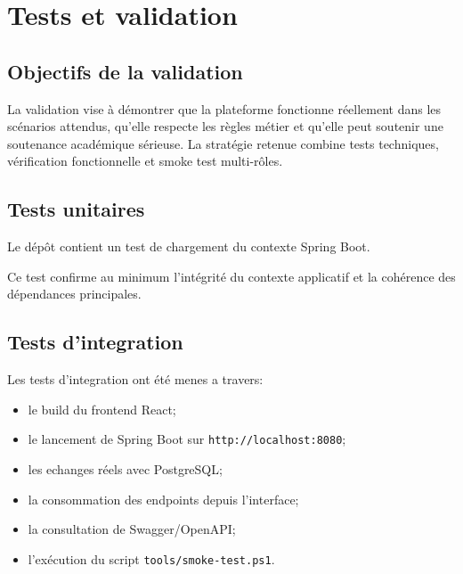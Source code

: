 ﻿\chapter{Tests et validation}
\label{chap:tests}

\section{Objectifs de la validation}
La validation vise à démontrer que la plateforme fonctionne réellement dans les scénarios attendus, qu'elle respecte les règles métier et qu'elle peut soutenir une soutenance académique sérieuse. La stratégie retenue combine tests techniques, vérification fonctionnelle et smoke test multi-rôles.

\section{Tests unitaires}
Le dépôt contient un test de chargement du contexte Spring Boot.

\begin{codeblock}[H]
\caption{Test automatise de chargement du contexte Spring Boot}

\end{codeblock}

Ce test confirme au minimum l'intégrité du contexte applicatif et la cohérence des dépendances principales.

\section{Tests d'integration}
Les tests d'integration ont été menes a travers:
\begin{itemize}
  \item le build du frontend React;
  \item le lancement de Spring Boot sur \texttt{http://localhost:8080};
  \item les echanges réels avec PostgreSQL;
  \item la consommation des endpoints depuis l'interface;
  \item la consultation de Swagger/OpenAPI;
  \item l'exécution du script \texttt{tools/smoke-test.ps1}.
\end{itemize}

